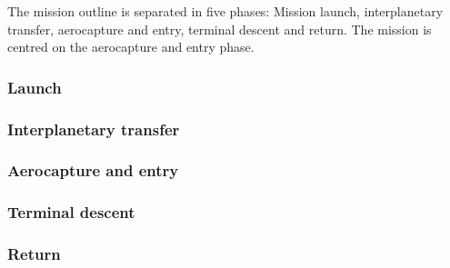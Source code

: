 The mission outline is separated in five phases: Mission launch, interplanetary transfer, aerocapture and entry, terminal descent and return. The mission is centred on the aerocapture and entry phase. %

\subsubsection{Launch} \label{sec:launch}


\subsubsection{Interplanetary transfer} \label{sec:interplanetary}


\subsubsection{Aerocapture and entry} \label{sec:entry}


\subsubsection{Terminal descent} \label{sec:terminal}


%

\subsubsection{Return} \label{sec:return}






